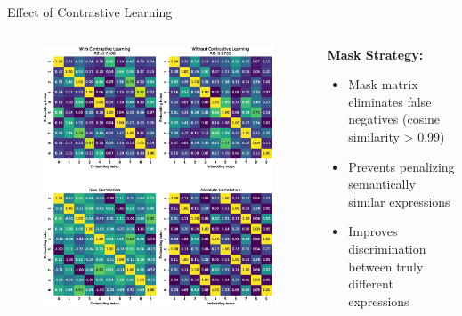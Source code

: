 \documentclass[aspectratio=1610]{beamer}
\begin{document}
    \begin{frame}{Effect of Contrastive Learning}
        \begin{columns}
            \begin{column}{0.55\textwidth}
                \begin{figure}
                    \centering
                    \includegraphics[height=0.8\textheight]{figs/data_augmentation_heatmap.eps}
                \end{figure}
            \end{column}

            \begin{column}{0.45\textwidth}
                \textbf{Mask Strategy:}
                \begin{itemize}
                    \item Mask matrix eliminates false negatives (cosine similarity > 0.99)
                    \item Prevents penalizing semantically similar expressions
                    \item Improves discrimination between truly different expressions
                \end{itemize}


\end{column}
\end{columns}
\end{frame}
\end{document}
